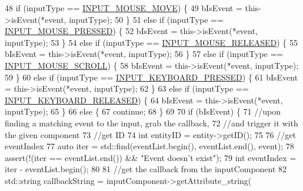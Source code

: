 \begin{DoxyCode}
48                 \textcolor{keywordflow}{if} (inputType == \hyperlink{_a_e___events_8h_ac7747a0fbf37233b9361b91131edd0d7}{INPUT\_MOUSE\_MOVE}) \{
49                     bIsEvent = this->isEvent(*event, inputType);
50                 \}
51                 \textcolor{keywordflow}{else} \textcolor{keywordflow}{if} (inputType == \hyperlink{_a_e___events_8h_a0dcdde95983d5fce1a7df006dc718ec3}{INPUT\_MOUSE\_PRESSED}) \{
52                     bIsEvent = this->isEvent(*event, inputType);
53                 \}
54                 \textcolor{keywordflow}{else} \textcolor{keywordflow}{if} (inputType == \hyperlink{_a_e___events_8h_a4b4b675ca09b559cbae96027bc2ae915}{INPUT\_MOUSE\_RELEASED}) \{
55                     bIsEvent = this->isEvent(*event, inputType);
56                 \}
57                 \textcolor{keywordflow}{else} \textcolor{keywordflow}{if} (inputType == \hyperlink{_a_e___events_8h_a1e35e7ec64832b1d0cc0bafe44589ef8}{INPUT\_MOUSE\_SCROLL}) \{
58                     bIsEvent = this->isEvent(*event, inputType);
59                 \}
60                 \textcolor{keywordflow}{else} \textcolor{keywordflow}{if} (inputType == \hyperlink{_a_e___events_8h_a7274317c7bc468f9f3a2acb0c3c1af9e}{INPUT\_KEYBOARD\_PRESSED}) \{
61                     bIsEvent = this->isEvent(*event, inputType);
62                 \}
63                 \textcolor{keywordflow}{else} \textcolor{keywordflow}{if} (inputType == \hyperlink{_a_e___events_8h_a52e3f3f9420b3574c792dfc9d57471d8}{INPUT\_KEYBOARD\_RELEASED}) \{
64                     bIsEvent = this->isEvent(*event, inputType);
65                 \}
66                 \textcolor{keywordflow}{else} \{
67                     \textcolor{keywordflow}{continue};
68                 \}
69 
70                 \textcolor{keywordflow}{if} (bIsEvent) \{
71                     \textcolor{comment}{//upon finding a matching event to the input, grab the callback, }
72                       \textcolor{comment}{//and trigger it with the given component}
73                     \textcolor{comment}{//get ID}
74                     \textcolor{keywordtype}{int} entityID = entity->getID();
75 
76                     \textcolor{comment}{//get eventIndex}
77                     \textcolor{keyword}{auto} iter = std::find(eventList.begin(), eventList.end(), event);
78                     assert(!(iter == eventList.end()) && \textcolor{stringliteral}{"Event doesn't exist"});
79                     \textcolor{keywordtype}{int} eventIndex = iter - eventList.begin();
80 
81                     \textcolor{comment}{//get the callback from the inputComponent}
82                     std::string callbackString = inputComponent->getAttribute\_string(

\end{DoxyCode}
